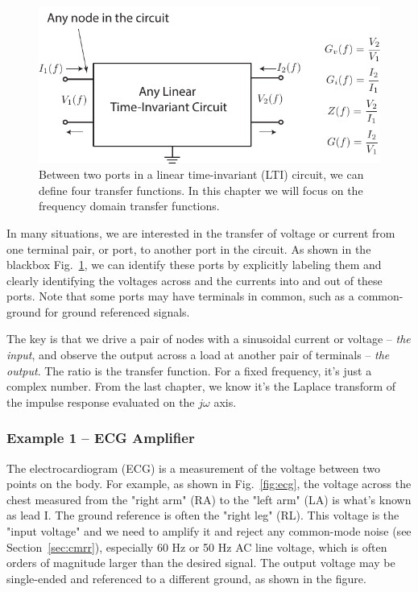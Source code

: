 \begin{figure}[tb]
\begin{center}
\includegraphics[scale=1]{transfer_func}
\end{center}
\caption{Between two ports in a linear time-invariant (LTI) circuit, we can define four transfer functions.  In this chapter we will focus on the frequency domain transfer functions.} \label{fig:blackboxltiports}
\end{figure}


In many situations, we are interested in the transfer of voltage or current from one terminal pair, or port, to another port in the circuit.  As shown in the blackbox Fig.~\ref{fig:blackboxltiports}, we can identify these ports by explicitly labeling them and clearly identifying the voltages across and the currents into and out of these ports.  Note that some ports may have terminals in common, such as a common-ground for ground referenced signals.  

The key is that we drive a pair of nodes with a sinusoidal current or voltage -- \textit{the input}, and observe the output across a load at another pair of terminals -- \textit{the output}.  The ratio is the transfer function.  For a fixed frequency, it’s just a complex number.  From the last chapter, we know it's the  Laplace transform of the impulse response evaluated on the $j\omega$ axis.
 



\subsubsection{Example 1 – ECG Amplifier}

The electrocardiogram (ECG) is a measurement of the voltage between two points on the body.  For example, as shown in Fig.~\ref{fig:ecg}, the voltage across the chest measured from the "right arm" (RA) to the "left arm" (LA) is what's known as lead I.  The ground reference is often the "right leg" (RL).  This voltage is the "input voltage" and we need to amplify it and reject any common-mode noise (see Section~\ref{sec:cmrr}), especially 60 Hz or 50 Hz AC line voltage, which is often orders of magnitude larger than the desired signal.  The output voltage may be single-ended and referenced to a different ground, as shown in the figure. 

